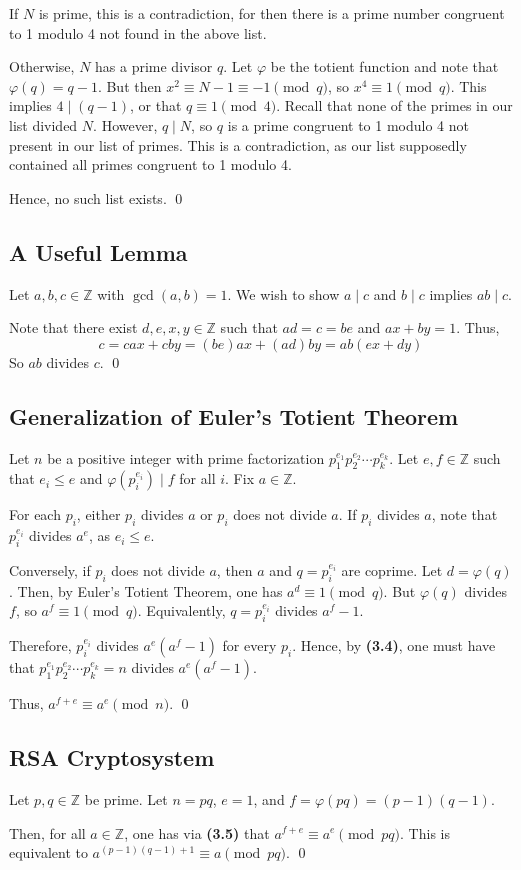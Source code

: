 \documentclass{article}
\newcommand{\Z}{\mathbb{Z}}
\begin{document}
  If $N$ is prime, this is a contradiction, for then there is a prime number
  congruent to 1 modulo 4 not found in the above list.

  Otherwise, $N$ has a prime divisor $q$. Let $\varphi$ be the totient function
  and note that $\varphi(q)=q-1$. But then $x^2\equiv N-1\equiv-1\pmod{q}$, so
  $x^4\equiv1\pmod{q}$. This implies $4\mid (q-1)$, or that $q\equiv1\pmod{4}$.
  Recall that none of the primes in our list divided $N$. However, $q\mid N$, so
  $q$ is a prime congruent to 1 modulo 4 not present in our list of primes. This
  is a contradiction, as our list supposedly contained all primes congruent to 1
  modulo 4.

  Hence, no such list exists.
  \qed

\subsection{A Useful Lemma}
  Let $a,b,c\in\Z$ with $\gcd(a,b)=1$. We wish to show $a\mid c$ and $b\mid c$
  implies $ab\mid c$.

  Note that there exist $d,e,x,y\in\Z$ such that $ad=c=be$ and $ax+by=1$. Thus,
  \begin{equation*}
    c = cax+cby=(be)ax+(ad)by=ab(ex+dy)
  \end{equation*}
  So $ab$ divides $c$.
  \qed

\subsection{Generalization of Euler's Totient Theorem}
  Let $n$ be a positive integer with prime factorization $p_1^{e_1}p_2^{e_2}
  \cdots p_k^{e_k}$. Let $e,f\in\Z$ such that $e_i\leq e$ and $\varphi(p_i^{e_i}
  )\mid f$ for all $i$. Fix $a\in\Z$.

  For each $p_i$, either $p_i$ divides $a$ or $p_i$ does not divide $a$. If
  $p_i$ divides $a$, note that $p_i^{e_i}$ divides $a^e$, as $e_i\leq e$.

  Conversely, if $p_i$ does not divide $a$, then $a$ and $q=p_i^{e_i}$ are
  coprime. Let $d=\varphi(q)$. Then, by Euler's Totient Theorem, one has $a^d
  \equiv1\pmod{q}$. But $\varphi(q)$ divides $f$, so $a^f\equiv1\pmod{q}$.
  Equivalently, $q=p_i^{e_i}$ divides $a^f-1$.

  Therefore, $p_i^{e_i}$ divides $a^e(a^f-1)$ for every $p_i$. Hence, by
  \textbf{(3.4)}, one must have that $p_1^{e_1}p_2^{e_2}\cdots p_k^{e_k}=n$
  divides $a^e(a^f-1)$.

  Thus, $a^{f+e}\equiv a^e\pmod{n}$.
  \qed

\subsection{RSA Cryptosystem}
  Let $p,q\in\Z$ be prime. Let $n=pq$, $e=1$, and $f=\varphi(pq)=(p-1)(q-1)$.

  Then, for all $a\in\Z$, one has via \textbf{(3.5)} that $a^{f+e}\equiv a^e
  \pmod{pq}$. This is equivalent to $a^{(p-1)(q-1)+1}\equiv a\pmod{pq}$.
  \qed
\end{document}
